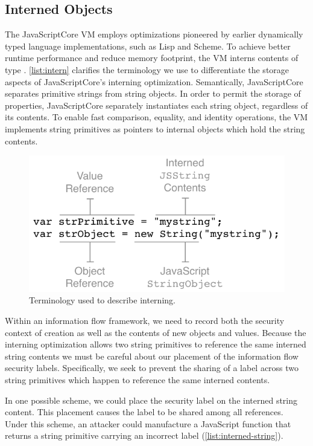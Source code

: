 \subsection{Interned Objects}\label{sec:interned-objects}

The JavaScriptCore VM employs optimizations pioneered by earlier dynamically typed language implementations, such as Lisp and Scheme.
To achieve better runtime performance and reduce memory footprint, the VM interns contents of type .
\autoref{list:intern} clarifies the terminology we use to differentiate the storage aspects of JavaScriptCore's interning optimization.
Semantically, JavaScriptCore separates primitive strings from string objects.
In order to permit the storage of properties, JavaScriptCore separately instantiates each string object, regardless of its contents.
To enable fast comparison, equality, and identity operations, the VM implements string primitives as pointers to internal  objects which hold the string contents.

\begin{figure}[h]
  \centerline{\includegraphics[keepaspectratio=true]{images/InternedTerminology.pdf}}
  \caption{Terminology used to describe interning.}
  \label{list:intern}
\end{figure}

Within an information flow framework, we need to record both the security context of creation as well as the contents of new objects and values.
Because the interning optimization allows two string primitives to reference the same interned string contents we must be careful about our placement of the information flow security labels.
Specifically, we seek to prevent the sharing of a label across two string primitives which happen to reference the same interned contents.

In one possible scheme, we could place the security label on the interned string content.
This placement causes the label to be shared among all references.
Under this scheme, an attacker could manufacture a JavaScript function that returns a string primitive carrying an incorrect label (\autoref{list:interned-string}).

